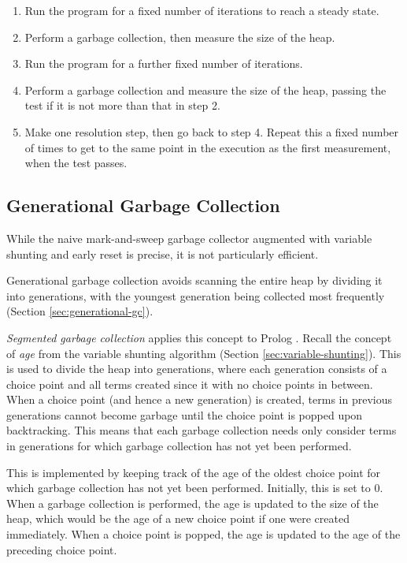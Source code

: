 \begin{enumerate}
\item Run the program for a fixed number of iterations to reach a steady state.
\item Perform a garbage collection, then measure the size of the heap.
\item Run the program for a further fixed number of iterations.
\item Perform a garbage collection and measure the size of the heap, passing the test if it is not more than that in step 2.
\item Make one resolution step, then go back to step 4. Repeat this a fixed number of times to get to the same point in the execution as the first measurement, when the test passes.
\end{enumerate}

\subsection{Generational Garbage Collection}

\label{sec:implementation-generational-gc}

While the naive mark-and-sweep garbage collector augmented with variable shunting and early reset is precise, it is not particularly efficient.

Generational garbage collection avoids scanning the entire heap by dividing it into generations, with the youngest generation being collected most frequently (Section \ref{sec:generational-gc}).

\emph{Segmented garbage collection} applies this concept to Prolog \cite{applebyGarbargecollectionProlog1988}. Recall the concept of \emph{age} from the variable shunting algorithm (Section \ref{sec:variable-shunting}). This is used to divide the heap into generations, where each generation consists of a choice point and all terms created since it with no choice points in between. When a choice point (and hence a new generation) is created, terms in previous generations cannot become garbage until the choice point is popped upon backtracking. This means that each garbage collection needs only consider terms in generations for which garbage collection has not yet been performed.

This is implemented by keeping track of the age of the oldest choice point for which garbage collection has not yet been performed. Initially, this is set to 0. When a garbage collection is performed, the age is updated to the size of the heap, which would be the age of a new choice point if one were created immediately. When a choice point is popped, the age is updated to the age of the preceding choice point.

